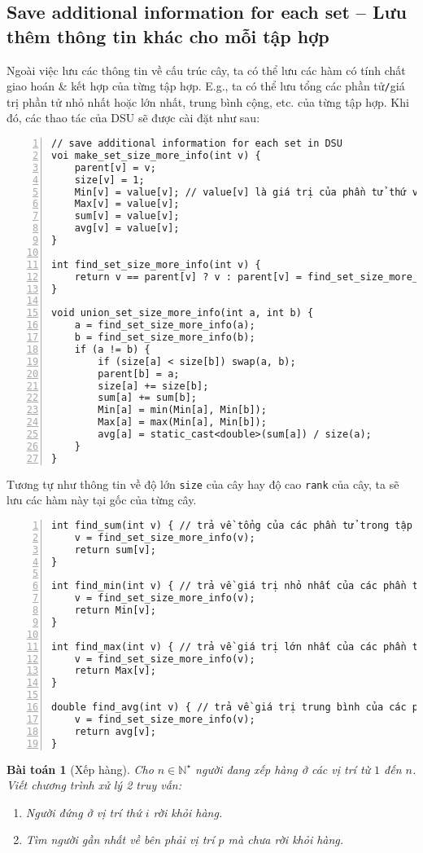 \documentclass{article}
\newtheorem{baitoan}{Bài toán}
\begin{document}
\subsection{Save additional information for each set -- Lưu thêm thông tin khác cho mỗi tập hợp}
Ngoài việc lưu các thông tin về cấu trúc cây, ta có thể lưu các hàm có tính chất giao hoán \& kết hợp của từng tập hợp. E.g., ta có thể lưu tổng các phần tử{\tt/}giá trị phần tử nhỏ nhất hoặc lớn nhất, trung bình cộng, etc. của từng tập hợp. Khi đó, các thao tác của DSU sẽ được cài đặt như sau:
\begin{Verbatim}[numbers=left,xleftmargin=5mm]
// save additional information for each set in DSU
voi make_set_size_more_info(int v) {
    parent[v] = v;
    size[v] = 1;
    Min[v] = value[v]; // value[v] là giá trị của phần tử thứ v
    Max[v] = value[v];
    sum[v] = value[v];
    avg[v] = value[v];
}

int find_set_size_more_info(int v) {
    return v == parent[v] ? v : parent[v] = find_set_size_more_info(parent[v]);
}

void union_set_size_more_info(int a, int b) {
    a = find_set_size_more_info(a);
    b = find_set_size_more_info(b);
    if (a != b) {
        if (size[a] < size[b]) swap(a, b);
        parent[b] = a;
        size[a] += size[b];
        sum[a] += sum[b];
        Min[a] = min(Min[a], Min[b]);
        Max[a] = max(Min[a], Min[b]);
        avg[a] = static_cast<double>(sum[a]) / size(a);
    }
}
\end{Verbatim}
Tương tự như thông tin về độ lớn {\tt size} của cây hay độ cao {\tt rank} của cây, ta sẽ lưu các hàm này tại gốc của từng cây.
\begin{Verbatim}[numbers=left,xleftmargin=5mm]
int find_sum(int v) { // trả về tổng của các phần tử trong tập hợp chứa v
    v = find_set_size_more_info(v);
    return sum[v];
}

int find_min(int v) { // trả về giá trị nhỏ nhất của các phần tử trong tập hợp chứa v
    v = find_set_size_more_info(v);
    return Min[v];
}

int find_max(int v) { // trả về giá trị lớn nhất của các phần tử trong tập hợp chứa v
    v = find_set_size_more_info(v);
    return Max[v];
}

double find_avg(int v) { // trả về giá trị trung bình của các phần tử trong tập hợp chứa v
    v = find_set_size_more_info(v);
    return avg[v];
}
\end{Verbatim}

\begin{baitoan}[Xếp hàng]
    Cho $n\in\mathbb{N}^\star$ người đang xếp hàng ở các vị trí từ $1$ đến $n$. Viết chương trình xử lý 2 truy vấn:
    \begin{enumerate}
        \item Người đứng ở vị trí thứ $i$ rời khỏi hàng.
        \item Tìm người gần nhất về bên phải vị trí $p$ mà chưa rời khỏi hàng.
    \end{enumerate}
\end{baitoan}
\end{document}
